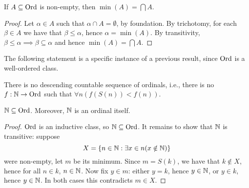 \documentclass[twoside,openright,titlepage,numbers=noenddot,%
               headinclude,footinclude,cleardoublepage=empty,abstract=on,
               BCOR=23mm,paper=letter,fontsize=11pt
               ]{scrreprt}
\begin{document}
\begin{proposition}
    If $A \subseteq \mathrm{Ord}$ is non-empty, then $\min(A) = \bigcap A$.
\end{proposition}
\begin{proof}
    Let $\alpha \in A$ such that $\alpha \cap A = \emptyset$, by foundation. By trichotomy, for each $\beta \in A$ we have that $\beta \leq \alpha$, hence $\alpha = \min(A)$. By transitivity, $\beta \leq \alpha \implies \beta \subseteq \alpha$ and hence $\min(A) = \bigcap A$.
\end{proof}
The following statement is a specific instance of a previous result, since $\mathrm{Ord}$ is a well-ordered class.
\begin{proposition}
    There is no descending countable sequence of ordinals, i.e., there is no $f: \mathbb{N} \to \mathrm{Ord}$ such that $\forall n(f(S(n)) < f(n))$.
\end{proposition}
\begin{proposition}
    $\mathbb{N} \subseteq \mathrm{Ord}$. Moreover, $\mathbb{N}$ is an ordinal itself.
\end{proposition}
\begin{proof}
    $\mathrm{Ord}$ is an inductive class, so $\mathbb{N} \subseteq \mathrm{Ord}$. It remains to show that $\mathbb{N}$ is transitive: suppose
    \[ X = \{n \in \mathbb{N}: \exists x \in n(x \notin \mathbb{N})\} \]
    were non-empty, let $m$ be its minimum. Since $m = S(k)$, we have that $k \notin X$, hence for all $n \in k$, $n \in \mathbb{N}$. Now fix $y \in m$: either $y = k$, hence $y \in \mathbb{N}$, or $y \in k$, hence $y \in \mathbb{N}$. In both cases this contradicts $m \in X$.
\end{proof}
\end{document}
